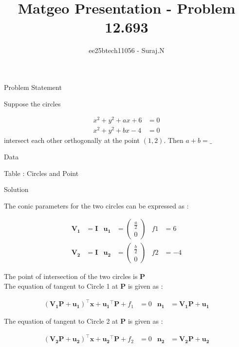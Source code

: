 \documentclass{beamer}
\title{Matgeo Presentation - Problem 12.693}
\author{ee25btech11056 - Suraj.N}
\numberwithin{equation}{section}
\theoremstyle{remark}
\newcommand{\myvec}[1]{\ensuremath{\begin{pmatrix}#1\end{pmatrix}}}
\let\vec\mathbf
\begin{document}
\begin{frame}
  \titlepage
\end{frame}

\begin{frame}{Problem Statement}

Suppose the circles 

\begin{align*}
x^2 + y^2 + ax + 6 &= 0 \\
x^2 + y^2 + bx - 4 &= 0
\end{align*}
intersect each other orthogonally at the point $(1,2)$. Then $a+b = \_$

\end{frame}

\begin{frame}{Data}

\begin{table}[h!]
  \centering
  
  \caption*{Table : Circles and Point}
  \label{12.693}
\end{table}

\end{frame}

\begin{frame}{Solution}

The conic parameters for the two circles can be expressed as :

\begin{align}
  \vec{V_1} &= \vec{I} & \vec{u_1} &= \myvec{\tfrac{a}{2} \\0 } & f1 &= 6\\
  \vec{V_2} &= \vec{I} & \vec{u_2} &= \myvec{\tfrac{b}{2} \\ 0} & f2 &= -4
\end{align}

The point of intersection of the two circles is $\vec{P}$\\

The equation of tangent to Circle 1 at $\vec{P}$ is given as :

\begin{align}
  (\vec{V_1}\vec{P}+\vec{u_1})^\top\vec{x} + \vec{u_1}^\top\vec{P} + f_1 &= 0 & \vec{n_1} &= \vec{V_1}\vec{P}+\vec{u_1} 
\end{align}

The equation of tangent to Circle 2 at $\vec{P}$ is given as :

\begin{align}
  (\vec{V_2}\vec{P}+\vec{u_2})^\top\vec{x} + \vec{u_2}^\top\vec{P} + f_2 &= 0 & \vec{n_2} &= \vec{V_2}\vec{P}+\vec{u_2} 
\end{align}

\end{frame}
\end{document}
